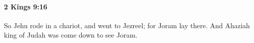 
		\paragraph{2 Kings 9:16} %
			\label{2KINGS-9-16}

			So Jehu rode in a chariot, and went to Jezreel; for Joram lay there. And Ahaziah king of Judah was come down to see Joram.


